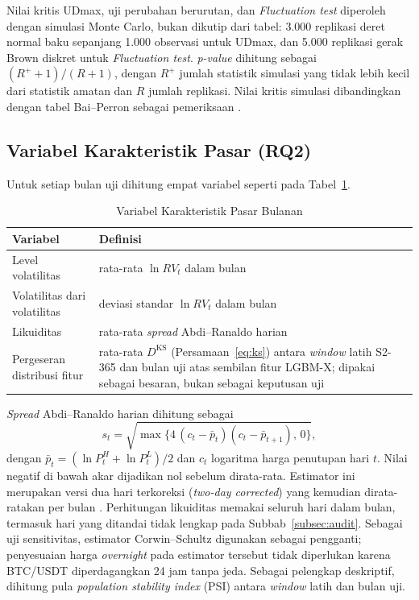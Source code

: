 Nilai kritis UDmax, uji perubahan berurutan, dan \textit{Fluctuation test}
diperoleh dengan simulasi Monte Carlo, bukan dikutip dari tabel: 3.000
replikasi deret normal baku sepanjang 1.000 observasi untuk UDmax, dan 5.000
replikasi gerak Brown diskret untuk \textit{Fluctuation test}.
\textit{p-value} dihitung sebagai $(R^{+}+1)/(R+1)$, dengan $R^{+}$ jumlah
statistik simulasi yang tidak lebih kecil dari statistik amatan dan $R$ jumlah
replikasi. Nilai kritis simulasi dibandingkan
dengan tabel Bai--Perron sebagai pemeriksaan \cite{bai1998}.


\subsection{Variabel Karakteristik Pasar (RQ2)}
\label{subsec:rq2var}
Untuk setiap bulan uji dihitung empat variabel seperti pada
Tabel~\ref{tab:rq2var}.

\begin{table}[htbp]
  \caption{Variabel Karakteristik Pasar Bulanan}
  \label{tab:rq2var}
  \centering
  \begingroup
  \small
  \begin{tabular}{|p{}|p{}|}
    \hline
    \textbf{Variabel} & \textbf{Definisi} \\
    \hline
    Level volatilitas & rata-rata $\ln RV_t$ dalam bulan \\
    \hline
    Volatilitas dari volatilitas & deviasi standar $\ln RV_t$ dalam bulan \\
    \hline
    Likuiditas & rata-rata \textit{spread} Abdi--Ranaldo harian
      \cite{abdi2017} \\
    \hline
    Pergeseran distribusi fitur & rata-rata $D^{\text{KS}}$
      (Persamaan~\eqref{eq:ks}) antara \textit{window} latih S2-365 dan bulan
      uji atas sembilan fitur LGBM-X; dipakai sebagai besaran, bukan sebagai
      keputusan uji \\
    \hline
  \end{tabular}
  \endgroup
\end{table}

\textit{Spread} Abdi--Ranaldo harian dihitung sebagai
\begin{equation}
  s_t = \sqrt{\max\{4\,(c_t - \bar{p}_t)(c_t - \bar{p}_{t+1}),\, 0\}},
  \label{eq:abdi}
\end{equation}
dengan $\bar{p}_t = (\ln P^H_t + \ln P^L_t)/2$ dan $c_t$ logaritma harga
penutupan hari $t$. Nilai negatif di bawah akar dijadikan nol sebelum
dirata-rata. Estimator ini merupakan versi dua hari terkoreksi
(\textit{two-day corrected}) yang kemudian dirata-ratakan per bulan
\cite{abdi2017}. Perhitungan likuiditas memakai seluruh hari dalam bulan,
termasuk hari yang ditandai tidak lengkap pada Subbab~\ref{subsec:audit}. Sebagai uji sensitivitas, estimator Corwin--Schultz
\cite{corwin2012} digunakan sebagai pengganti; penyesuaian harga
\textit{overnight} pada estimator tersebut tidak diperlukan karena BTC/USDT
diperdagangkan 24 jam tanpa jeda. Sebagai pelengkap deskriptif,
dihitung pula \textit{population stability index} (PSI) antara \textit{window}
latih dan bulan uji.

